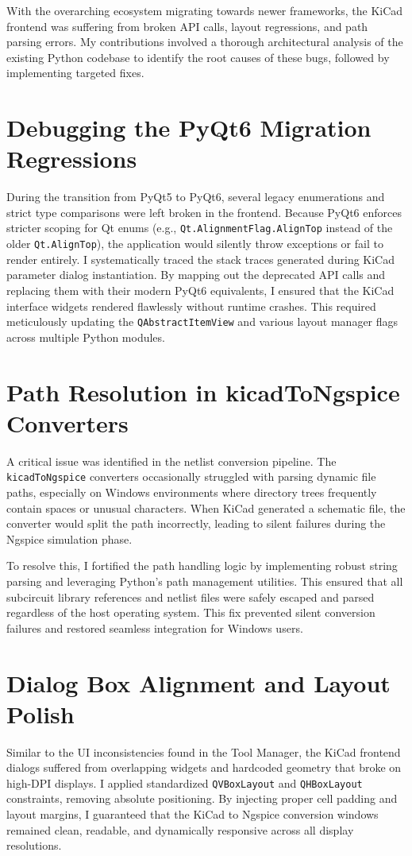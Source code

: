 \documentclass[12pt,a4paper]{report}
\begin{document}
With the overarching ecosystem migrating towards newer frameworks, the KiCad frontend was suffering from broken API calls, layout regressions, and path parsing errors. My contributions involved a thorough architectural analysis of the existing Python codebase to identify the root causes of these bugs, followed by implementing targeted fixes.

\section{Debugging the PyQt6 Migration Regressions}
During the transition from PyQt5 to PyQt6, several legacy enumerations and strict type comparisons were left broken in the frontend. Because PyQt6 enforces stricter scoping for Qt enums (e.g., \texttt{Qt.AlignmentFlag.AlignTop} instead of the older \texttt{Qt.AlignTop}), the application would silently throw exceptions or fail to render entirely. I systematically traced the stack traces generated during KiCad parameter dialog instantiation. By mapping out the deprecated API calls and replacing them with their modern PyQt6 equivalents, I ensured that the KiCad interface widgets rendered flawlessly without runtime crashes. This required meticulously updating the \texttt{QAbstractItemView} and various layout manager flags across multiple Python modules.

\section{Path Resolution in kicadToNgspice Converters}
A critical issue was identified in the netlist conversion pipeline. The \texttt{kicadToNgspice} converters occasionally struggled with parsing dynamic file paths, especially on Windows environments where directory trees frequently contain spaces or unusual characters. When KiCad generated a schematic file, the converter would split the path incorrectly, leading to silent failures during the Ngspice simulation phase.

To resolve this, I fortified the path handling logic by implementing robust string parsing and leveraging Python's path management utilities. This ensured that all subcircuit library references and netlist files were safely escaped and parsed regardless of the host operating system. This fix prevented silent conversion failures and restored seamless integration for Windows users.

\section{Dialog Box Alignment and Layout Polish}
Similar to the UI inconsistencies found in the Tool Manager, the KiCad frontend dialogs suffered from overlapping widgets and hardcoded geometry that broke on high-DPI displays. I applied standardized \texttt{QVBoxLayout} and \texttt{QHBoxLayout} constraints, removing absolute positioning. By injecting proper cell padding and layout margins, I guaranteed that the KiCad to Ngspice conversion windows remained clean, readable, and dynamically responsive across all display resolutions.
\end{document}
